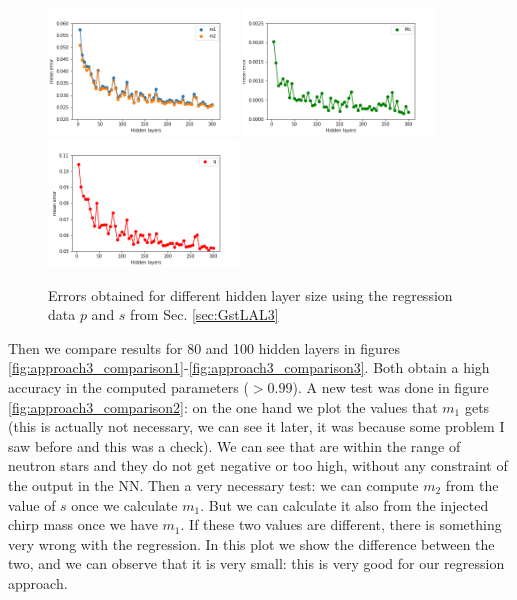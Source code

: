 \documentclass[prd,aps,twocolumn,a4paper,showkeys,nofootinbib]{article}
\begin{document}
\begin{figure}[]
  \center
  \includegraphics[width=0.45\textwidth]{./Figs/merrorwlayers}
  \includegraphics[width=0.45\textwidth]{./Figs/mcerrorwlayers}
  \includegraphics[width=0.45\textwidth]{./Figs/qerrorwlayers}
  \caption{\label{fig:error_with_layers} Errors obtained for different hidden layer size using the regression data $p$ and $s$ from Sec. \ref{sec:GstLAL3}}
\end{figure}

Then we compare results for 80 and 100 hidden layers in figures  \ref{fig:approach3_comparison1}-\ref{fig:approach3_comparison3}. Both obtain a high accuracy in the computed parameters ($>0.99$). A new test was done in figure \ref{fig:approach3_comparison2}: on the one hand we plot the values that $m_1$ gets (this is actually not necessary, we can see it later, it was because some problem I saw before and this was a check). We can see that are within the range of neutron stars and they do not get negative or too high, without any constraint of the output in the NN. Then a very necessary test: we can compute $m_2$ from the value of $s$ once we calculate $m_1$. But we can calculate it also from the injected chirp mass once we have $m_1$. If these two values are different, there is something very wrong with the regression. In this plot we show the difference between the two, and we can observe that it is very small: this is very good for our regression approach.
\end{document}
